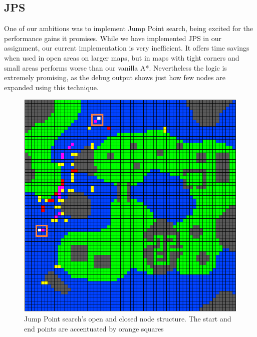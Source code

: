 \documentclass{article}
\begin{document}
\subsection{JPS}
One of our ambitions was to implement Jump Point search, being excited for the performance gains it promises. While we have implemented JPS in our assignment, our current implementation is very inefficient. It offers time savings when used in open areas on larger maps, but in maps with tight corners and small areas performs worse than our vanilla A*. Nevertheless the logic is extremely promising, as the debug output shows just how few nodes are expanded using this technique.

\begin{figure}[h!]
\includegraphics[width=\textwidth]{jps}
\caption{Jump Point search's open and closed node structure. The start and end points are accentuated by orange squares}
\end{figure}


% 
% 
\end{document}
